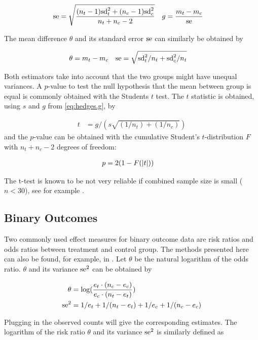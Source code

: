 \documentclass[11pt,a4paper,twoside]{book}\usepackage[]{graphicx}\usepackage[]{color}
\begin{document}
\begin{align}
\operatorname{se} &= \sqrt{\frac{(n_t - 1)\textrm{sd}_t^2 + (n_c - 1)\textrm{sd}_c^2}{n_t + n_c - 2}} & g &= \frac{m_t - m_c}{\operatorname{se}} \label{eq:hedges.g}
\end{align}

The mean difference $\theta$ and its standard error $\operatorname{se}$ can similarly be obtained by

\begin{align}
\theta &= m_t - m_c & \operatorname{se} &= \sqrt{\textrm{sd}_t^2/n_t + \textrm{sd}_c^2/n_t}
\end{align}

Both estimators take into account that the two groups might have unequal variances. A $p$-value to test the null hypothesis that the mean between group is equal is commonly obtained with the Students $t$ test. The $t$ statistic is obtained, using $s$ and $g$ from \ref{eq:hedges.g}, by

\begin{align}
t &= g/(s\sqrt{(1/n_t)+(1/n_c)}) \nonumber
\end{align}
and the $p$-value can be obtained with the cumulative Student's $t$-distribution $F$ with $n_t + n_c - 2$ degrees of freedom:

\begin{align}
p &= 2(1-F(\left\lvert t\right\rvert)) \nonumber
\end{align}

The t-test is known to be not very reliable if combined sample size is small ($n < 30$), see for example \citet{t.test}.

\subsection{Binary Outcomes}
Two commonly used effect measures for binary outcome data are risk ratios and odds ratios between treatment and control group. 
The methods presented here can also be found, for example, in \cite[34]{Intro.meta}.
Let $\theta$ be the natural logarithm of the odds ratio. $\theta$ and its variance $\operatorname{se}^2$ can be obtained by 

\begin{align}
\theta &= \log(\frac{e_t\cdot(n_c - e_c)}{e_c\cdot(n_t - e_t)}) \nonumber \\
\operatorname{se}^2 &= 1/e_t + 1/(n_t - e_t) + 1/e_c + 1/(n_c - e_c) \nonumber
\end{align}

Plugging in the observed counts will give the corresponding estimates. The logarithm of the risk ratio $\theta$ and its variance $\operatorname{se}^2$ is similarly defined as
\end{document}

